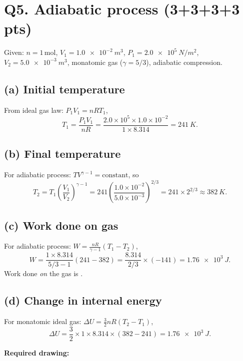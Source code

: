 \documentclass[11pt]{article}
\newcommand{\ans}[1]{\boxed{\displaystyle #1}}
\begin{document}
\section*{Q5. Adiabatic process (3+3+3+3 pts)}

Given: \(n = 1\,\text{mol}\), \(V_1 = \SI{1.0e-2}{m^3}\),
\(P_1 = \SI{2.0e5}{N/m^2}\), \(V_2 = \SI{5.0e-3}{m^3}\),
monatomic gas (\(\gamma = 5/3\)), adiabatic compression.

\subsection*{(a) Initial temperature}
From ideal gas law: \(P_1 V_1 = nRT_1\),
\[
T_1 = \frac{P_1 V_1}{nR} = \frac{2.0 \times 10^5 \times 1.0 \times 10^{-2}}{1 \times 8.314}
= \ans{\SI{241}{K}}.
\]

\subsection*{(b) Final temperature}
For adiabatic process: \(T V^{\gamma-1} = \text{constant}\), so
\[
T_2 = T_1 \left(\frac{V_1}{V_2}\right)^{\gamma-1}
= 241 \left(\frac{1.0 \times 10^{-2}}{5.0 \times 10^{-3}}\right)^{2/3}
= 241 \times 2^{2/3} \approx \ans{\SI{382}{K}}.
\]

\subsection*{(c) Work done on gas}
For adiabatic process: \(W = \frac{nR}{\gamma-1}(T_1 - T_2)\),
\[
W = \frac{1 \times 8.314}{5/3 - 1}(241 - 382)
= \frac{8.314}{2/3} \times (-141)
= \SI{1.76e3}{J}.
\]
Work done \emph{on} the gas is \ans{+\SI{1.76e3}{J}}.

\subsection*{(d) Change in internal energy}
For monatomic ideal gas: \(\Delta U = \frac{3}{2}nR(T_2 - T_1)\),
\[
\Delta U = \frac{3}{2} \times 1 \times 8.314 \times (382 - 241)
= \ans{\SI{1.76e3}{J}}.
\]

\noindent\textbf{Required drawing:}
\begin{center}
  \end{center}
\end{document}
